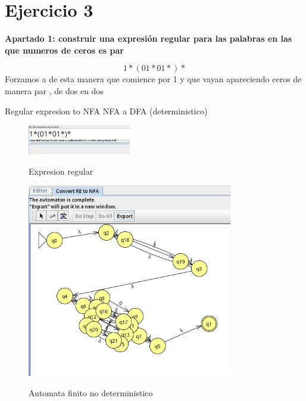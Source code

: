 \documentclass{article}
\begin{document}
        \section*{Ejercicio 3}
        \textbf{Apartado 1: construir una expresión regular para las palabras en las que numeros de ceros es par}
        
        \vspace{\baselineskip} %

        $$ 1*(01*01*)*$$
        Forzamos a de esta manera que comience por 1 y que vayan apareciendo ceros de manera par , de dos en dos
        
        Regular expresion to NFA
        NFA a DFA (deterministico)
       
        \begin{figure}[!h]
            \centering
            \includegraphics[width=0.4\textwidth]{./Imagenes/image19.png}
            \label{fig:label4}
            \caption{Expresion regular}
        \end{figure}

        \begin{figure}[!h]
            \centering
            \includegraphics[width=0.8\textwidth]{./Imagenes/image14.png}
            \label{fig:label4}
            \caption{Automata finito no deterministico}
        \end{figure}
\end{document}
